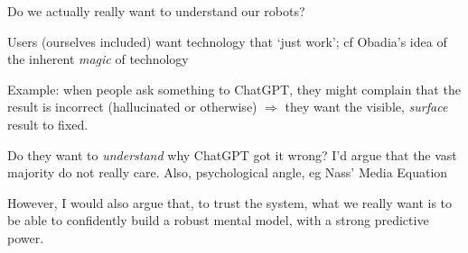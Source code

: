 \documentclass[xcolor=table,aspectratio=169]{beamer}
\begin{document}
\begin{frame}{Do we actually really want to understand our robots?}


    Users (ourselves included) want technology that `just work'; cf Obadia's idea of the inherent \emph{magic} of technology

    \pause

    Example: when people ask something to ChatGPT, they might complain that the
    result is incorrect (hallucinated or otherwise) $\Rightarrow$ they
    want the visible, \emph{surface} result to fixed.

    \pause

    Do they want to \emph{understand} why ChatGPT got it wrong? I'd argue that
    the vast majority do not really care. {\footnotesize Also, psychological
    angle, eg Nass' Media Equation}

    \pause

    However, I would also argue that, to trust the system, what we really want
    is to be able to \alert<5>{confidently} build a
    \alert<6>{robust mental model}, with a strong \alert<7>{predictive
    power}.





\end{frame}
\end{document}
